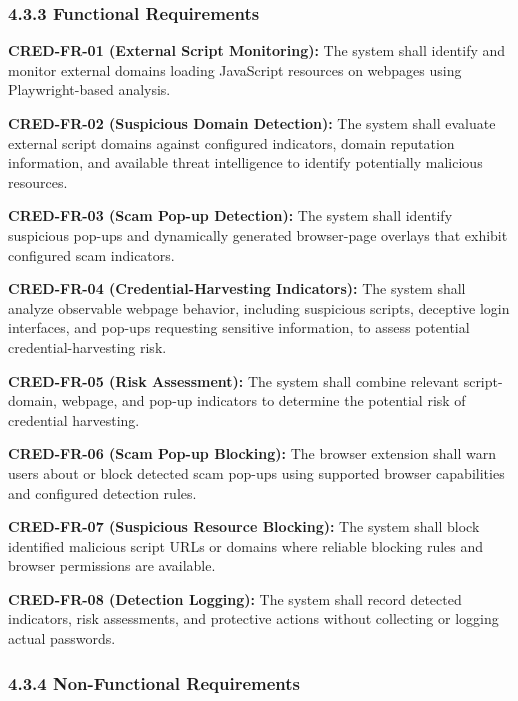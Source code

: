 \documentclass[12pt,a4paper]{report}
\begin{document}
\subsubsection*{4.3.3 Functional Requirements}

\textbf{CRED-FR-01 (External Script Monitoring):} The system shall identify and monitor external domains loading JavaScript resources on webpages using Playwright-based analysis.\par

\textbf{CRED-FR-02 (Suspicious Domain Detection):} The system shall evaluate external script domains against configured indicators, domain reputation information, and available threat intelligence to identify potentially malicious resources.\par

\textbf{CRED-FR-03 (Scam Pop-up Detection):} The system shall identify suspicious pop-ups and dynamically generated browser-page overlays that exhibit configured scam indicators.\par

\textbf{CRED-FR-04 (Credential-Harvesting Indicators):} The system shall analyze observable webpage behavior, including suspicious scripts, deceptive login interfaces, and pop-ups requesting sensitive information, to assess potential credential-harvesting risk.\par

\textbf{CRED-FR-05 (Risk Assessment):} The system shall combine relevant script-domain, webpage, and pop-up indicators to determine the potential risk of credential harvesting.\par

\textbf{CRED-FR-06 (Scam Pop-up Blocking):} The browser extension shall warn users about or block detected scam pop-ups using supported browser capabilities and configured detection rules.\par

\textbf{CRED-FR-07 (Suspicious Resource Blocking):} The system shall block identified malicious script URLs or domains where reliable blocking rules and browser permissions are available.\par

\textbf{CRED-FR-08 (Detection Logging):} The system shall record detected indicators, risk assessments, and protective actions without collecting or logging actual passwords.\par

\subsubsection*{4.3.4 Non-Functional Requirements}
\end{document}
